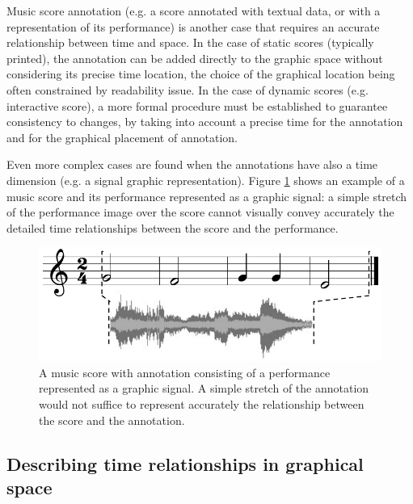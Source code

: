 \documentclass[letterpaper, 12pt]{article}
\begin{document}
Music score annotation (e.g. a score annotated with textual data, or with a representation of its performance) is another case that requires an accurate relationship between time and space. 
In the case of static scores (typically printed), the annotation can be added directly to the graphic space without considering its precise time location, the choice of the graphical location being often constrained by readability issue. In the case of dynamic scores (e.g. interactive score), a more formal procedure must be established to guarantee consistency to changes, by taking into account a precise time for the annotation and for the graphical placement of annotation.

Even more complex cases are found when the annotations have also a time dimension (e.g. a signal graphic representation). Figure \ref{fig-score-sig} shows an example of a music score and its performance represented as a graphic signal: a simple stretch of the performance image over the score cannot visually convey accurately the detailed time relationships between the score and the performance. 
\begin{figure} %
\begin{center}
	\includegraphics[width=0.9\baseimgwidth]{imgs/fig-score-sig3}
\caption{A music score with annotation consisting of a performance represented as a graphic signal. A simple stretch of the annotation would not suffice to represent accurately the  relationship between the score and the annotation. }
\label{fig-score-sig}
\end{center}
\end{figure}

\subsection{Describing time relationships in graphical space}
\label{sec:timetograph}
\end{document}
